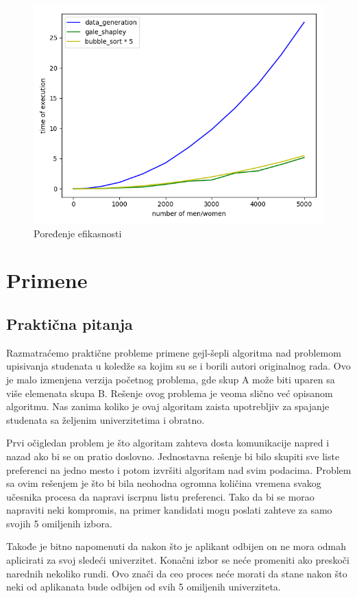 \documentclass[a4paper]{article}
\begin{document}
\begin{figure}
	\centering
	\includegraphics[scale=0.5]{resources/execution_comparison.png}
	\caption{Poređenje efikasnosti}
	\label{fig1}
\end{figure}
\section{Primene}

\subsection{Praktična pitanja}
Razmatraćemo praktične probleme primene gejl-šepli algoritma nad problemom upisivanja studenata u koledže sa kojim su se i borili autori originalnog rada. Ovo je malo izmenjena verzija početnog problema, gde skup A može biti uparen sa više elemenata skupa B. Rešenje ovog problema je veoma slično već opisanom algoritmu. Nas zanima koliko je ovaj algoritam zaista upotrebljiv za spajanje studenata sa željenim univerzitetima i obratno.

Prvi očigledan problem je što algoritam zahteva dosta komunikacije napred i nazad ako bi se on pratio doslovno. Jednostavna rešenje bi bilo skupiti sve liste preferenci na jedno mesto i potom izvršiti algoritam nad svim podacima. Problem sa ovim rešenjem je što bi bila neohodna ogromna količina vremena svakog učesnika procesa da napravi iscrpnu listu preferenci. Tako da bi se morao napraviti neki kompromis, na primer kandidati mogu poslati zahteve za samo svojih 5 omiljenih izbora.

Takođe je bitno napomenuti da nakon što je aplikant odbijen on ne mora odmah aplicirati za svoj sledeći univerzitet. Konačni izbor se neće promeniti ako preskoči narednih nekoliko rundi. Ovo znači da ceo proces neće morati da stane nakon što neki od aplikanata bude odbijen od svih 5 omiljenih univerziteta.
\end{document}
